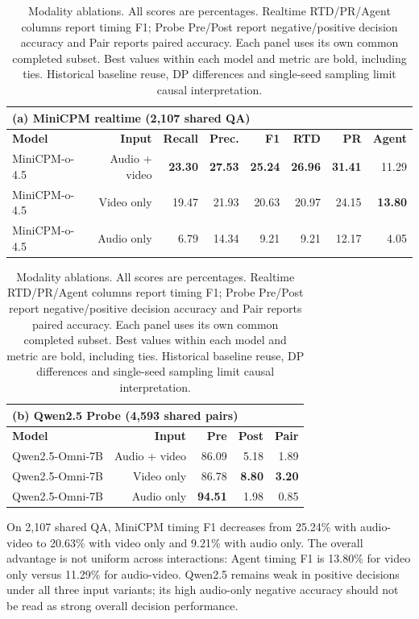 \begin{table}[t]
\centering
{\small
\setlength{\tabcolsep}{3pt}
\begin{tabular}{lrrrrrrr}
\hline
\multicolumn{8}{l}{\textbf{(a) MiniCPM realtime (2,107 shared QA)}} \\
\hline
\textbf{Model} & \textbf{Input} & \textbf{Recall} & \textbf{Prec.} & \textbf{F1} & \textbf{RTD} & \textbf{PR} & \textbf{Agent} \\
\hline
MiniCPM-o-4.5 & Audio + video & \textbf{23.30} & \textbf{27.53} & \textbf{25.24} & \textbf{26.96} & \textbf{31.41} & 11.29 \\
MiniCPM-o-4.5 & Video only & 19.47 & 21.93 & 20.63 & 20.97 & 24.15 & \textbf{13.80} \\
MiniCPM-o-4.5 & Audio only & 6.79 & 14.34 & 9.21 & 9.21 & 12.17 & 4.05 \\
\hline
\end{tabular}
\par\medskip
\begin{tabular}{lrrrr}
\hline
\multicolumn{5}{l}{\textbf{(b) Qwen2.5 Probe (4,593 shared pairs)}} \\
\hline
\textbf{Model} & \textbf{Input} & \textbf{Pre} & \textbf{Post} & \textbf{Pair} \\
\hline
Qwen2.5-Omni-7B & Audio + video & 86.09 & 5.18 & 1.89 \\
Qwen2.5-Omni-7B & Video only & 86.78 & \textbf{8.80} & \textbf{3.20} \\
Qwen2.5-Omni-7B & Audio only & \textbf{94.51} & 1.98 & 0.85 \\
\hline
\end{tabular}
}
\caption{Modality ablations. All scores are percentages. Realtime RTD/PR/Agent columns report timing F1; Probe Pre/Post report negative/positive decision accuracy and Pair reports paired accuracy. Each panel uses its own common completed subset. Best values within each model and metric are bold, including ties. Historical baseline reuse, DP differences and single-seed sampling limit causal interpretation.}
\label{tab:modality-ablations}
\end{table}

On 2,107 shared QA, MiniCPM timing F1 decreases from 25.24\% with audio-video to 20.63\% with video only and 9.21\% with audio only. The overall advantage is not uniform across interactions: Agent timing F1 is 13.80\% for video only versus 11.29\% for audio-video. Qwen2.5 remains weak in positive decisions under all three input variants; its high audio-only negative accuracy should not be read as strong overall decision performance.

